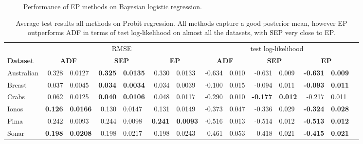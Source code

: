 \begin{figure}
\centering
\def\svgwidth{0.31\linewidth}
\subfigure[\label{fig:sep_probit}]{
}
%
%
\def\svgwidth{0.31\linewidth}
\subfigure[\label{fig:daep_probit}]{
}
%
%
\def\svgwidth{0.31\linewidth}
\subfigure[\label{fig:mnist}]{
}
\caption{Performance of EP methods on Bayesian logistic regression.}
\end{figure}

\begin{table} 
\small
\centering \label{tab:probit_results} \begin{tabular}{l@{\ica}r@{$\pm$}l@{\ica}r@{$\pm$}l@{\ica}r@{$\pm$}l@{\ica}r@{$\pm$}l@{\ica}r@{$\pm$}
	l@{\ica}r@{$\pm$}l@{\ica}r@{$\pm$}}\hline 
{} & \multicolumn{6}{c}{RMSE} & \multicolumn{6}{c}{test log-likelihood} \\
\bf{Dataset}&\multicolumn{2}{c}{\bf{ ADF }}&\multicolumn{2}{c}{\bf{ SEP }}&\multicolumn{2}{c}{\bf{ EP }} &\multicolumn{2}{c}{\bf{ ADF }}&\multicolumn{2}{c}{\bf{ SEP }}&\multicolumn{2}{c}{\bf{ EP }} \\ \hline 
%
Australian&0.328&0.0127&\bf{0.325}&\bf{0.0135}&0.330&0.0133
	&-0.634&0.010&-0.631&0.009&\bf{-0.631}&\bf{0.009}\\
%
Breast&0.037&0.0045&\bf{0.034}&\bf{0.0034}&0.034&0.0039
	&-0.100&0.015&-0.094&0.011&\bf{-0.093}&\bf{0.011}\\
%
Crabs&0.062&0.0125&\bf{0.040}&\bf{0.0106}&0.048&0.0117
	&-0.290&0.010&\bf{-0.177}&\bf{0.012}&-0.217&0.011\\
%
Ionos&\bf{0.126}&\bf{0.0166}&0.130&0.0147&0.131&0.0149
	&-0.373&0.047&-0.336&0.029&\bf{-0.324}&\bf{0.028}\\
%
Pima&0.242&0.0093&0.244&0.0098&\bf{0.241}&\bf{0.0093}
	&-0.516&0.013&-0.514&0.012&\bf{-0.513}&\bf{0.012}\\
%
Sonar&\bf{0.198}&\bf{0.0208}&0.198&0.0217&0.198&0.0243
	&-0.461&0.053&-0.418&0.021&\bf{-0.415}&\bf{0.021}\\
 \hline \end{tabular} 
 \caption{ Average test results all methods on Probit regression. All methods capture a good posterior mean, however EP outperforms ADF in terms of test log-likelihood on almost all the datasets, with SEP very close to EP.}
 \end{table} 